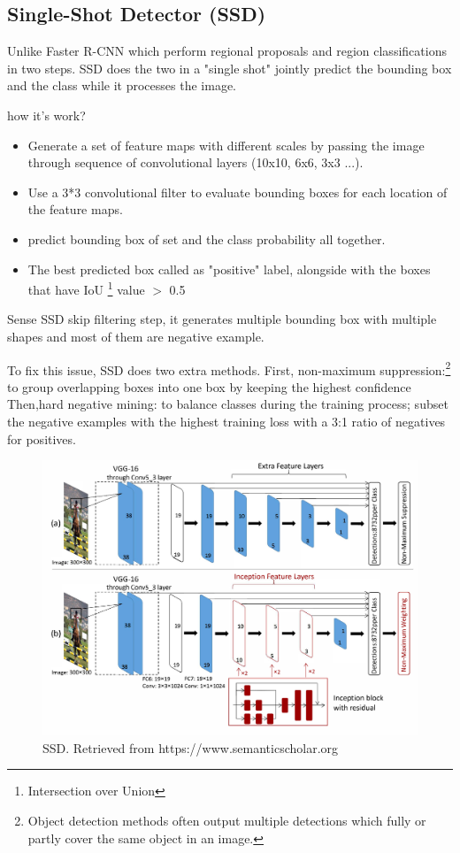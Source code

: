 \documentclass[12pt]{report}
\begin{document}
\subsection{Single-Shot Detector (SSD)}

Unlike Faster R-CNN which perform regional proposals 
and region classifications in two steps. SSD does the two in a "single shot"
jointly predict the bounding box and the class while it processes the image.

how it's work?
\begin{itemize}
    \item Generate a set of feature maps with different scales by passing 
    the image through sequence of convolutional layers (10x10, 6x6, 3x3 ...).
    \item Use a 3*3 convolutional filter to evaluate bounding boxes for each 
    location of the feature maps.
    \item predict bounding box of set and the class probability all together.
    \item The best predicted box called as "positive" label, alongside with
    the boxes that have IoU \footnote{Intersection over Union } value $>$ 0.5 
\end{itemize}
Sense SSD skip filtering step, it generates multiple bounding box with multiple shapes
and most of them are negative example.

To fix this issue, SSD does two extra methods.
First, non-maximum suppression:\footnote{Object detection methods often output 
multiple detections which fully or partly cover the same object in an image.}
to group overlapping boxes into one box by keeping the highest confidence
Then,hard negative mining: to balance classes during the training process; 
subset the negative examples with the highest training loss with a 3:1 ratio 
of negatives for positives.\cite{Liu2016}

\begin{figure}[h]
    \centering
    \includegraphics[width=\textwidth]{./images/ssd.png}
    \caption{SSD. Retrieved from https://www.semanticscholar.org}
    \label{fig:frcnn}
\end{figure} 
\end{document}
